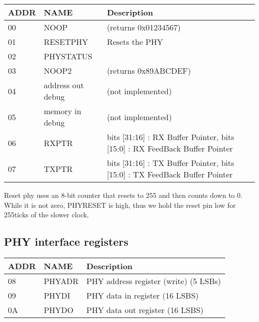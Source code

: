 \begin{tabular}{|l|l|p{5in}|}
\hline
ADDR & NAME & Description \\
\hline
00 & NOOP & (returns 0x01234567) \\
\hline
01 & RESETPHY & Resets the PHY \\
\hline
02 & PHYSTATUS  & \\
\hline
03 & NOOP2 &  (returns 0x89ABCDEF) \\
\hline
04 & address out debug & (not implemented) \\
\hline
05 & memory in debug & (not implemented) \\
\hline
06 & RXPTR &  bits [31:16] : RX Buffer Pointer, bits [15:0] : RX FeedBack Buffer Pointer \\
\hline
07 & TXPTR &  bits [31:16] : TX Buffer Pointer, bits [15:0] : TX FeedBack Buffer Pointer \\
\hline
\end{tabular}

Reset phy uses an 8-bit counter that resets to 255 and then counts
down to 0. While it is not zero, PHYRESET is high, thus we hold the
reset pin low for 255ticks of the slower clock.


\subsection{PHY interface registers} 
\begin{tabular}{|l|l|p{5in}|}
\hline
ADDR & NAME & Description \\
\hline
08 & PHYADR & PHY address register (write) (5 LSBs) \\
\hline
09 & PHYDI & PHY data in register (16 LSBS) \\ 
\hline
0A & PHYDO & PHY data out register (16 LSBS) \\
\hline
\end{tabular}

